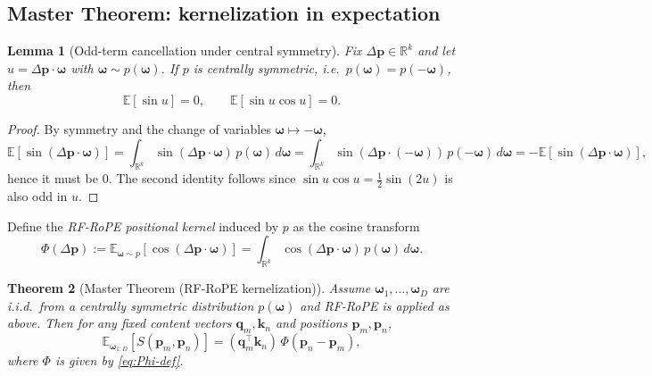 \documentclass{article}
\theoremstyle{plain}
\newtheorem{theorem}{Theorem}[section]
\newtheorem{lemma}[theorem]{Lemma}
\theoremstyle{remark}
\begin{document}
\subsection{Master Theorem: kernelization in expectation}

\begin{lemma}[Odd-term cancellation under central symmetry]
\label{lem:sine-cancel}
Fix $\Delta\mathbf{p}\in\mathbb{R}^k$ and let $u=\Delta\mathbf{p}\cdot\boldsymbol{\omega}$ with $\boldsymbol{\omega}\sim p(\boldsymbol{\omega})$. If $p$ is centrally symmetric, i.e.\ $p(\boldsymbol{\omega})=p(-\boldsymbol{\omega})$, then
\[
\mathbb{E}[\sin u]=0,
\qquad
\mathbb{E}[\sin u \cos u]=0.
\]
\end{lemma}

\begin{proof}
By symmetry and the change of variables $\boldsymbol{\omega}\mapsto -\boldsymbol{\omega}$,
\[
\mathbb{E}[\sin(\Delta\mathbf{p}\cdot\boldsymbol{\omega})]
=
\int_{\mathbb{R}^k}\sin(\Delta\mathbf{p}\cdot\boldsymbol{\omega})\,p(\boldsymbol{\omega})\,d\boldsymbol{\omega}
=
\int_{\mathbb{R}^k}\sin(\Delta\mathbf{p}\cdot(-\boldsymbol{\omega}))\,p(-\boldsymbol{\omega})\,d\boldsymbol{\omega}
=
-\mathbb{E}[\sin(\Delta\mathbf{p}\cdot\boldsymbol{\omega})],
\]
hence it must be $0$. The second identity follows since $\sin u\cos u=\tfrac{1}{2}\sin(2u)$ is also odd in $u$.
\end{proof}

Define the \emph{RF-RoPE positional kernel} induced by $p$ as the cosine transform
\begin{equation}
\label{eq:Phi-def}
\Phi(\Delta\mathbf{p})
:= \mathbb{E}_{\boldsymbol{\omega}\sim p}\!\left[\cos(\Delta\mathbf{p}\cdot\boldsymbol{\omega})\right]
=
\int_{\mathbb{R}^k}\cos(\Delta\mathbf{p}\cdot\boldsymbol{\omega})\,p(\boldsymbol{\omega})\,d\boldsymbol{\omega}.
\end{equation}

\begin{theorem}[Master Theorem (RF-RoPE kernelization)]
\label{thm:master}
Assume $\boldsymbol{\omega}_1,\ldots,\boldsymbol{\omega}_D$ are i.i.d.\ from a centrally symmetric distribution $p(\boldsymbol{\omega})$ and RF-RoPE is applied as above. Then for any fixed content vectors $\mathbf{q}_m,\mathbf{k}_n$ and positions $\mathbf{p}_m,\mathbf{p}_n$,
\[
\mathbb{E}_{\boldsymbol{\omega}_{1:D}}\!\left[S(\mathbf{p}_m,\mathbf{p}_n)\right]
=
(\mathbf{q}_m^\top \mathbf{k}_n)\,\Phi(\mathbf{p}_n-\mathbf{p}_m),
\]
where $\Phi$ is given by \eqref{eq:Phi-def}.
\end{theorem}
\end{document}
